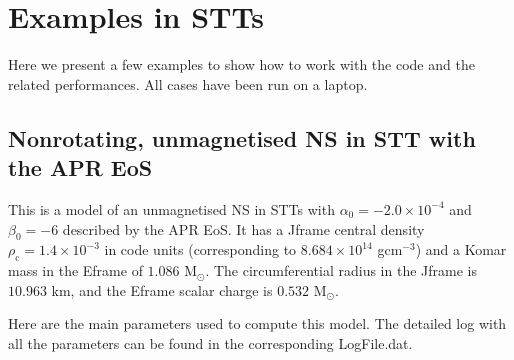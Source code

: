 \documentclass[letterpaper,10pt,english]{sphinxmanual}
\begin{document}
\sphinxstepscope


\chapter{Examples in STTs}
\label{\detokenize{examples_stt:examples-in-stts}}\label{\detokenize{examples_stt::doc}}
\sphinxAtStartPar
Here we present a few examples to show how to work with the code and the related performances. All
cases have been run on a laptop.


\section{Non\sphinxhyphen{}rotating, unmagnetised NS in STT with the APR EoS}
\label{\detokenize{examples_stt:non-rotating-unmagnetised-ns-in-stt-with-the-apr-eos}}
\sphinxAtStartPar
This is a model of an unmagnetised NS in STTs with \(\alpha _0 = -2.0\times 10^{-4}\) and \(\beta _0 = -6\) described by the APR EoS. It has a J\sphinxhyphen{}frame central density \(\rho _\mathrm{c}=1.4\times 10^{-3}\) in code units (corresponding to \(8.684\times 10^{14}\) gcm\(^{-3}\)) and a Komar mass in the E\sphinxhyphen{}frame of \(1.086\) M\( _\odot\). The circumferential radius in the J\sphinxhyphen{}frame is \(10.963\) km, and the E\sphinxhyphen{}frame scalar charge is \(0.532\) M\( _\odot\).

\sphinxAtStartPar
Here are the main parameters used to compute this model. The detailed log with all the parameters can be found in the corresponding LogFile.dat.

\begin{sphinxVerbatim}[commandchars=\\\{\}]
                    
                 
              
              
\end{sphinxVerbatim}
\end{document}
